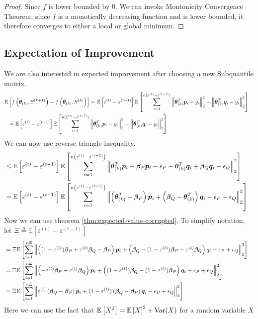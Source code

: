 \documentclass{article} %
\newcommand{\norm}[1]{\left\lVert#1\right\rVert}
\begin{document}
\begin{appendices}
\begin{proof}
	Since $f$ is lower bounded by $0$. We can invoke Montonicity Convergence Theorem, since $f$ is a monotically decreasing function and is lower bounded, it therefore converges to either a local or global minimum. 
	\end{proof}
	
	\subsection{Expectation of Improvement}
	We are also interested in expected improvement after choosing a new Subquantile matrix. 
	\begin{align*}
		\mathbb{E}&\left[f\left(\vtheta_{(k)}, S^{(k+1)}\right) - f\left(\vtheta_{(k)}, S^{(k)}\right)\right] = \mathbb{E}\left[\varepsilon^{(t)} - \varepsilon^{(t-1)}\right]\mathbb{E}\left[\sum_{i=1}^{n(\varepsilon^{(t)}-\varepsilon^{(t-1)})}\norm{\vtheta_{(k)}^T\vp_i -y_i}_2^2 - \norm{\vtheta_{(k)}^T\vq_i - y_i}_2^2\right] &&\\
		&= \mathbb{E}\left[\varepsilon^{(t)} - \varepsilon^{(t-1)}\right]\mathbb{E}\left[\sum_{i=1}^{n(\varepsilon^{(t)}-\varepsilon^{(t-1)})}\norm{\vtheta_{(k)}^T\vp_i -y_i}_2^2 - \norm{\vtheta_{(k)}^T\vq_i - y_i}_2^2\right] &&
	\end{align*}
	We can now use reverse triangle inequality.
	\begin{align*}
		&\leq \mathbb{E}\left[\varepsilon^{(t)} - \varepsilon^{(t-1)}\right] \mathbb{E}\left[\sum_{i=1}^{n\left(\varepsilon^{(t)}-\varepsilon^{(t-1)}\right)}\norm{\vtheta_{(k)}^T\vp_i - \vbeta_P\vp_i - \eps_P - \vtheta^T_{(k)}\vq_i + \vbeta_Q\vq_i + \eps_Q}_2^2 \right] &&\\
		&= \mathbb{E}\left[\varepsilon^{(t)} - \varepsilon^{(t-1)}\right] \mathbb{E}\left[\sum_{i=1}^{n\left(\varepsilon^{(t)}-\varepsilon^{(t-1)}\right)}\norm{\left(\vtheta^T_{(k)} - \vbeta_P\right)\vp_i + \left(\vbeta_Q - \vtheta^T_{(k)}\right)\vq_i - \eps_P+ \eps_Q}_2^2 \right] &&
	\end{align*}
	Now we can use theorem \ref{thm:expected-value-corrupted}. To simplify notation, let $\Xi \triangleq \mathbb{E}\left[\varepsilon^{(t)} - \varepsilon^{(t-1)}\right]$
	\begin{align*}
		&= \Xi \mathbb{E}\left[\sum_{i=1}^{n\Xi}\norm{\left((1-\varepsilon^{(t)})\vbeta_P + \varepsilon^{(t)}\vbeta_Q - \vbeta_P\right)\vp_i + \left(\vbeta_Q - (1 - \varepsilon^{(t)})\vbeta_P - \varepsilon^{(t)}\vbeta_Q \right)q_i - \eps_P+ \eps_Q}_2^2 \right] &&\\
		&= \Xi \mathbb{E}\left[\sum_{i=1}^{n\Xi}\norm{\left(-\varepsilon^{(t)}\vbeta_P + \varepsilon^{(t)}\vbeta_Q\right)\vp_i + \left((1 - \varepsilon^{(t)})\vbeta_Q - (1 - \varepsilon^{(t)})\vbeta_P\right)\vq_i - \eps_P+ \eps_Q}_2^2 \right] &&\\
		&= \Xi \mathbb{E}\left[\sum_{i=1}^{n\Xi}\norm{\varepsilon^{(t)}\left(\vbeta_Q - \vbeta_P\right)\vp_i + (1 - \varepsilon^{(t)})\left(\vbeta_Q - \vbeta_P\right)\vq_i - \eps_P+ \eps_Q}_2^2 \right] &&
	\end{align*}
	Here we can use the fact that $\mathbb{E}\left[X^2\right] = \mathbb{E}\left[X\right]^2 + \mathrm{Var}(X)$ for a random variable $X$


\end{appendices}
\end{document}

